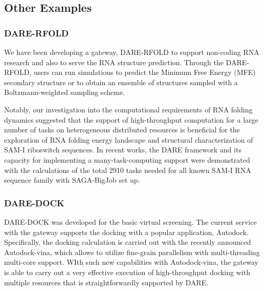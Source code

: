 \documentclass[]{svjour3}
\begin{document}
\subsection{Other Examples}
\subsubsection{DARE-RFOLD}
We have been developing a gateway, DARE-RFOLD to support non-coding RNA research
and also to serve the RNA structure prediction. Through the DARE-RFOLD,
users can run simulations to predict the Minimum Free Energy (MFE) secondary
structure or to obtain an ensemble of structures sampled with a Boltzmann-weighted
sampling scheme.


Notably, our investigation into the computational requirements of RNA
folding dynamics suggested that the support of high-throughput
computation for a large number of tasks on heterogeneous distributed
resources is beneficial for the exploration of RNA folding energy
landscape and structural characterization of SAM-I riboswitch
sequences. In recent works\cite{ecmls10,ccpe11}, the DARE
framework and its capacity for implementing a many-task-computing
support were demonstrated with the calculations of the total 2910
tasks needed for all known SAM-I RNA sequence family with SAGA-BigJob set up.


\subsubsection{DARE-DOCK}
DARE-DOCK was developed for the basic virtual screening.  The current service with the gateway supports the docking with a popular application, Autodock\cite{autodock}.   Specifically, the docking calculation is carried out with the recently announced Autodock-vina, which allows to utilize fine-grain parallelism with multi-threading multi-core
support.  WIth such new capabilities with Autodock-vina, the gateway is able to carry out a very effective execution of high-throughput docking with multiple resources that is straightforwardly supported by DARE.  
\end{document}
